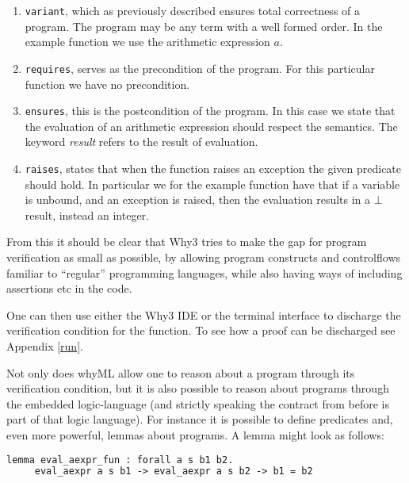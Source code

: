 \begin{enumerate}
  \item \texttt{variant}, which as previously described ensures total correctness of a program. The program may be any term with a well formed order. In the example function we use the arithmetic expression $a$.
  \item \texttt{requires}, serves as the precondition of the program. For this particular function we have no precondition.
  \item \texttt{ensures}, this is the postcondition of the program. In this case we state that the evaluation of an arithmetic expression should respect the semantics. The keyword \textit{result} refers to the result of evaluation.
  \item \texttt{raises}, states that when the function raises an exception the given predicate should hold. In particular we for the example function have that if a variable is unbound, and an exception is raised, then the evaluation results in a $\bot$ result, instead an integer.
\end{enumerate}

From this it should be clear that Why3 tries to make the gap for program verification as small
as possible, by allowing program constructs and controlflows familiar to ``regular''
programming languages, while also having ways of including assertions etc in the code.

One can then use either the Why3 IDE or the terminal interface to discharge the verification condition for the function. To see how a proof can be discharged see Appendix \ref{run}.

Not only does whyML allow one to reason about a program through its verification condition,
but it is also possible to reason about programs through the embedded logic-language
(and strictly speaking the contract from before is part of that logic language).
For instance it is possible to define predicates and, even more powerful, lemmas about programs.
A lemma might look as follows:

\begin{lstlisting}[caption={Lemma stating determinism of arithmetic expressions},label={lst:why3fun},language=sml]
  lemma eval_aexpr_fun : forall a s b1 b2.
     eval_aexpr a s b1 -> eval_aexpr a s b2 -> b1 = b2
   \end{lstlisting}

